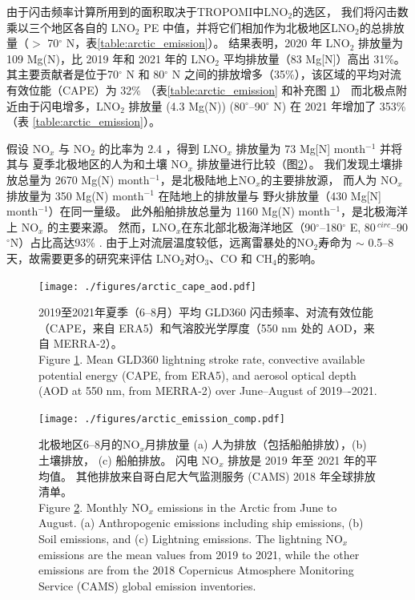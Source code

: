 由于闪击频率计算所用到的面积取决于TROPOMI中LNO$_2$的选区，
我们将闪击数乘以三个地区各自的 LNO$_2$ PE 中值，并将它们相加作为北极地区LNO$_2$的总排放量（$>$ 70$^{\circ}$ N，表\ref{table:arctic_emission}）。
结果表明，2020 年 LNO$_2$ 排放量为 109 Mg(N)，比 2019 年和 2021 年的 LNO$_2$ 平均排放量（83 Mg[N]）高出 31\%。
其主要贡献者是位于70$^{\circ}$ N 和 80$^{\circ}$ N 之间的排放增多（35\%），该区域的平均对流有效位能（CAPE）为 32\% （表\ref{table:arctic_emission} 和补充图 \ref{fig:arctic_cape_aod}）
而北极点附近由于闪电增多，LNO$_2$ 排放量 (4.3 Mg(N)) (80$^{\circ}$--90$^{\circ}$ N) 在 2021 年增加了 353\% （表 \ref{table:arctic_emission}）。

假设 NO$_x$ 与 NO$_2$ 的比率为 2.4 \citep{Silvern.2018}，得到 LNO$_x$ 排放量为 73 Mg[N] month$^{-1}$ 并将其与 夏季北极地区的人为和土壤 NO$_x$ 排放量进行比较（图\ref{fig:arctic_emission_comp}）。
我们发现土壤排放总量为 2670 Mg(N) month$^{-1}$，是北极陆地上NO$_x$的主要排放源，
而人为 NO$_x$ 排放量为 350 Mg(N) month$^{-1 }$ 在陆地上的排放量与 野火排放量（430 Mg[N] month$^{-1}$）在同一量级。
此外船舶排放总量为 1160 Mg(N) month$^{-1}$，是北极海洋上 NO$_x$ 的主要来源。
然而，LNO$_x$在东北部北极海洋地区（90$^{\circ}$--180$^{\circ}$ E, 80$^{\ circ}$--90$^{\circ}$N）占比高达93\% .
由于上对流层温度较低，远离雷暴处的NO$_2$寿命为 $\sim$ 0.5--8 天\citep{Schumann.2007,Nault.2017}，故需要更多的研究来评估 LNO$_2$对O$_3$、CO 和 CH$_4$的影响。


\begin{figure}[!htbp]
\centering
\texttt{[image: ./figures/arctic\_cape\_aod.pdf]}
\caption{
2019至2021年夏季（6--8月）平均 GLD360 闪击频率、对流有效位能（CAPE，来自 ERA5）和气溶胶光学厚度（550 nm 处的 AOD，来自 MERRA-2）。\\
Figure \ref{fig:arctic_cape_aod}.
Mean GLD360 lightning stroke rate, convective available potential energy (CAPE, from ERA5), and aerosol optical depth (AOD at 550 nm, from MERRA-2) over June--August of 2019–-2021.
}
\label{fig:arctic_cape_aod}
\end{figure}


\begin{figure}[htbp]
\centering
\texttt{[image: ./figures/arctic\_emission\_comp.pdf]}
\caption{
北极地区6--8月的NO$_x$月排放量
(a) 人为排放（包括船舶排放），(b) 土壤排放，
(c) 船舶排放。
闪电 NO$_x$ 排放是 2019 年至 2021 年的平均值。
其他排放来自哥白尼大气监测服务 (CAMS) 2018 年全球排放清单。\\
Figure \ref{fig:arctic_emission_comp}. Monthly NO$_x$ emissions in the Arctic from June to August.
(a) Anthropogenic emissions including ship emissions, (b) Soil emissions, and (c) Lightning emissions.
The lightning NO$_x$ emissions are the mean values from 2019 to 2021, while the other emissions are from the 2018 Copernicus Atmosphere Monitoring Service (CAMS) global emission inventories.
}
\label{fig:arctic_emission_comp}
\end{figure}


